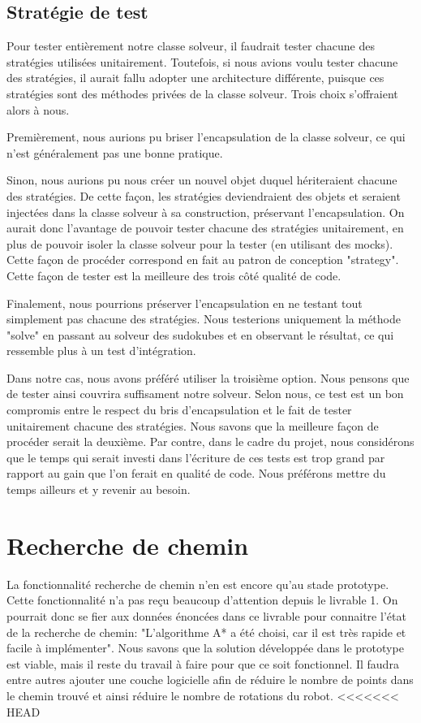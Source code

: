 \subsection{Stratégie de test}
Pour tester entièrement notre classe solveur, il faudrait tester chacune des stratégies utilisées unitairement. Toutefois, si nous avions voulu tester chacune des stratégies, il aurait fallu adopter une architecture différente, puisque ces stratégies sont des méthodes privées de la classe solveur. Trois choix s'offraient alors à nous.

Premièrement, nous aurions pu briser l'encapsulation de la classe solveur, ce qui n'est généralement pas une bonne pratique.

Sinon, nous aurions pu nous créer un nouvel objet duquel hériteraient chacune des stratégies. De cette façon, les stratégies deviendraient des objets et seraient injectées dans la classe solveur à sa construction, préservant l'encapsulation. On aurait donc l'avantage de pouvoir tester chacune des stratégies unitairement, en plus de pouvoir isoler la classe solveur pour la tester (en utilisant des mocks). Cette façon de procéder correspond en fait au patron de conception "strategy". Cette façon de tester est la meilleure des trois côté qualité de code.

Finalement, nous pourrions préserver l'encapsulation en ne testant tout simplement pas chacune des stratégies. Nous testerions uniquement la méthode "solve" en passant au solveur des sudokubes et en observant le résultat, ce qui ressemble plus à un test d'intégration.

Dans notre cas, nous avons préféré utiliser la troisième option. Nous pensons que de tester ainsi couvrira suffisament notre solveur. Selon nous, ce test est un bon compromis entre le respect du bris d'encapsulation et le fait de tester unitairement chacune des stratégies. Nous savons que la meilleure façon de procéder serait la deuxième. Par contre, dans le cadre du projet, nous considérons que le temps qui serait investi dans l'écriture de ces tests est trop grand par rapport au gain que l'on ferait en qualité de code. Nous préférons mettre du temps ailleurs et y revenir au besoin.

\section{Recherche de chemin}
La fonctionnalité recherche de chemin n’en est encore qu’au stade prototype. Cette fonctionnalité n'a pas reçu beaucoup d'attention depuis le livrable 1. On pourrait donc se fier aux données énoncées dans ce livrable pour connaitre l'état de la recherche de chemin: "L'algorithme A* a été choisi, car il est très rapide et facile à implémenter". Nous savons que la solution développée dans le prototype est viable, mais il reste du travail à faire pour que ce soit fonctionnel. Il faudra entre autres ajouter une couche logicielle afin de réduire le nombre de points dans le chemin trouvé et ainsi réduire le nombre de rotations du robot.
<<<<<<< HEAD

